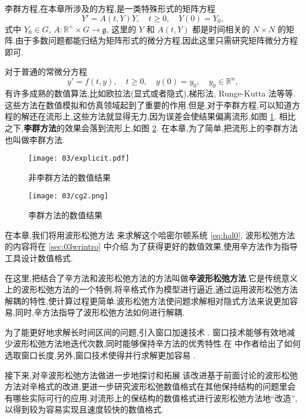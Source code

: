 李群方程,在本章所涉及的方程,是一类特殊形式的矩阵方程
\begin{equation*}
	Y'=A(t,Y)Y,\quad t\geq 0,\quad Y(0)=Y_0,
\end{equation*}
式中 $Y_0\in G $, $A:\mathbb{R}^+\times G\to \mathfrak{g}$, 这里的 $Y$ 和 $A(t,Y)$ 都是时间相关的 $N\times N$ 的矩阵.由于多数问题都能归结为矩阵形式的微分方程,因此这里只需研究矩阵微分方程即可.

对于普通的常微分方程
\begin{equation*}
	y'=f(t,y),\quad t\geq 0,\quad y(0)=y_0,\quad y_0 \in \mathbb{R}^n,
\end{equation*}
有许多成熟的数值算法,比如欧拉法(显式或者隐式),梯形法, Runge-Kutta 法等等.这些方法在数值模拟和仿真领域起到了重要的作用.但是,对于李群方程,可以知道方程的解还在流形上,这些方法就显得无力,因为误差会使结果偏离流形,如图 \ref{fig:explicit}. 相比之下,\textbf{李群方法}的效果会落到流形上,如图 \ref{fig:midpoint}. 在本章,为了简单,把流形上的李群方法也叫做李群方法.

\begin{figure}[h!]
  \centering
  \texttt{[image: 03/explicit.pdf]}
  \caption{非李群方法的数值结果}
  \label{fig:explicit}
\end{figure}

\begin{figure}[h!]
  \centering
  \texttt{[image: 03/cg2.png]}
  \caption{李群方法的数值结果}
  \label{fig:midpoint}
\end{figure}

在本章,我们将用波形松弛方法 \cite{jiang2009wr} 来求解这个哈密尔顿系统 \eqref{eq:hal0}, 波形松弛方法的内容将在 \ref{sec:03wrintro} 中介绍.为了获得更好的数值效果,使用辛方法作为指导工具设计数值格式.

在这里,把结合了辛方法和波形松弛方法的方法叫做\textbf{辛波形松弛方法}.它是传统意义上的波形松弛方法的一个特例,将辛格式作为模型进行逼近,通过运用波形松弛方法解耦的特性,使计算过程更简单.波形松弛方法使问题求解相对隐式方法来说更加容易,同时,辛方法指导了波形松弛方法如何进行解耦.

为了能更好地求解长时间区间的问题,引入窗口加速技术 \cite{jiang2006windowing,ladics2015error}. 窗口技术能够有效地减少波形松弛方法地迭代次数,同时能够保持辛方法的优秀特性.在 \cite{jiang2006windowing} 中作者给出了如何选取窗口长度,另外,窗口技术使得并行求解更加容易 \cite{liu2011waveform}.

接下来,对辛波形松弛方法做进一步地探讨和拓展.该改进基于前面讨论的波形松弛方法对辛格式的改进,更进一步研究波形松弛数值格式在其他保持结构的问题里会有哪些实际可行的应用.对流形上的保结构的数值格式进行波形松弛方法地``改造'',以得到较为容易实现且速度较快的数值格式.

